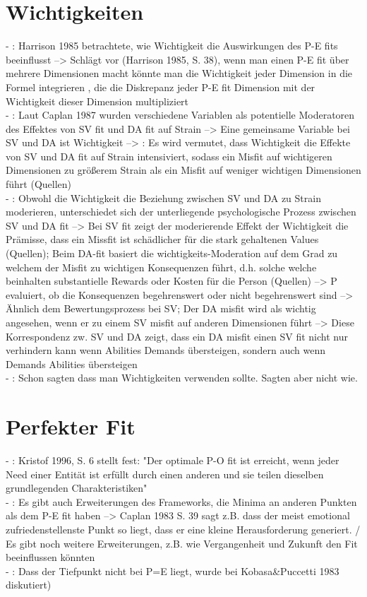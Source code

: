 \section{Wichtigkeiten}
\label{ch:personEnvironmentFit:wichtigkeiten}
- \cite[S. 23f.]{edwards:2008}: Harrison 1985 betrachtete, wie Wichtigkeit die Auswirkungen des P-E fits beeinflusst --> Schlägt vor (Harrison 1985, S. 38), wenn man einen P-E fit über mehrere Dimensionen macht könnte man die Wichtigkeit jeder Dimension in die Formel integrieren , die die Diskrepanz jeder P-E fit Dimension mit der Wichtigkeit dieser Dimension multipliziert \\
- \cite[S. 9]{edwards:1996}: Laut Caplan 1987 wurden verschiedene Variablen als potentielle Moderatoren des Effektes von SV fit und DA fit auf Strain --> Eine gemeinsame Variable bei SV und DA ist Wichtigkeit --> \cite[S. 10]{edwards:1996}: Es wird vermutet, dass Wichtigkeit die Effekte von SV und DA fit auf Strain intensiviert, sodass ein Misfit auf wichtigeren Dimensionen zu größerem Strain als ein Misfit auf weniger wichtigen Dimensionen führt (Quellen)\\
- \cite[S. 10]{edwards:1996}: Obwohl die Wichtigkeit die Beziehung zwischen SV und DA zu Strain moderieren, unterschiedet sich der unterliegende psychologische Prozess zwischen SV und DA fit --> Bei SV fit zeigt der moderierende Effekt der Wichtigkeit die Prämisse, dass ein Missfit ist schädlicher für die stark gehaltenen Values (Quellen); Beim DA-fit basiert die wichtigkeits-Moderation auf dem Grad zu welchem der Misfit zu wichtigen Konsequenzen führt, d.h. solche welche beinhalten substantielle Rewards oder Kosten für die Person (Quellen) --> P evaluiert, ob die Konsequenzen begehrenswert oder nicht begehrenswert sind --> Ähnlich dem Bewertungsprozess bei SV; Der DA misfit wird als wichtig angesehen, wenn er zu einem SV misfit auf anderen Dimensionen führt --> Diese Korrespondenz zw. SV und DA zeigt, dass ein DA misfit einen SV fit nicht nur verhindern kann wenn Abilities Demands übersteigen, sondern auch wenn Demands Abilities übersteigen \\
- \cite[S. 20f.]{edwards:2008}: Schon \textcite{copingAndAdaption:1974} sagten dass man Wichtigkeiten verwenden sollte. Sagten aber nicht wie.


\section{Perfekter Fit}
\label{ch:personEnvironmentFit:perfekterFit}
- \cite[S. 4]{edwards:2004}: Kristof 1996, S. 6 stellt fest: "Der optimale P-O fit ist erreicht, wenn jeder Need einer Entität ist erfüllt durch einen anderen und sie teilen dieselben grundlegenden Charakteristiken" \\
- \cite[S. 23]{edwards:2008}: Es gibt auch Erweiterungen des Frameworks, die Minima an anderen Punkten als dem P-E fit haben --> Caplan 1983 S. 39 sagt z.B. dass der meist emotional zufriedenstellenste Punkt so liegt, dass er eine kleine Herausforderung generiert. / Es gibt noch weitere Erweiterungen, z.B. wie Vergangenheit und Zukunft den Fit beeinflussen könnten \\
- \cite[S. 6]{caplan:1987}: Dass der Tiefpunkt nicht bei P=E liegt, wurde bei Kobasa\&Puccetti 1983 diskutiert)


